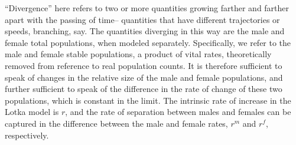 \label{sec:Divergence}
``Divergence'' here refers to two or more quantities growing farther and
farther apart with the passing of time-- quantities that have different
trajectories or speeds, branching, say. The quantities diverging in this way are
the male and female total populations, when modeled separately. Specifically, we refer to
the male and female stable populations, a product of vital rates,
theoretically removed from reference to real population counts. It is therefore
sufficient to speak of changes in the relative size of the male and female
populations, and further sufficient to speak of the
difference in the rate of change of these two populations, which is constant in
the limit. The intrinsic rate of increase in the Lotka model is $r$, and the
rate of separation between males and females can be captured in the difference
between the male and female rates, $r^m$ and $r^f$, respectively.

